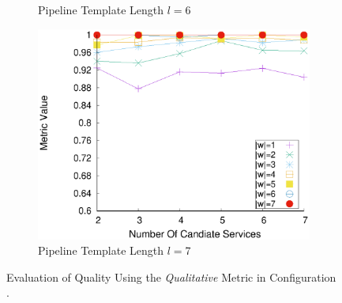 \begin{figure}[ht!]
\begin{subfigure}{0.49\textwidth}
        \caption{Pipeline Template Length $l$$=$6}
        \label{fig:quality_window_wide_qualitative_n6}
      \end{subfigure}
      \hfill
      \begin{subfigure}{0.49\textwidth}
        \includegraphics[width=\textwidth]{Images/graphs/window_quality_performance_diff_qual_n7_s7_20_100_n7}
        \caption{Pipeline Template Length $l$$=$7}
        \label{fig:quality_window_wide_qualitative_n7}
      \end{subfigure}


      \caption{Evaluation of Quality Using the \emph{Qualitative} Metric in Configuration \wide.}  \label{fig:quality_window_qualitative_wide}
    \end{figure}


